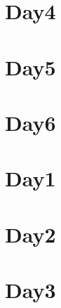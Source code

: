 
\section*{Day4}

\vfill
\section*{Day5}

\vfill
\section*{Day6}

\vfill
\section*{Day1}

\vfill
\section*{Day2}

\vfill
\section*{Day3}

\vfill
